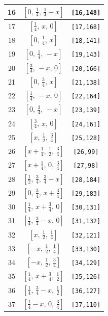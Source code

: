 \documentclass[fleqn,8pt]{jsarticle}
\begin{document}
\begin{longtable}{ccc}
16 & $\left[ 0,\, \frac{1}{4},\, \frac{1}{4} - x \right]$ & {\tt [16,148]} \\ \hline
17 & $\left[ \frac{1}{4},\, x,\, 0 \right]$ & {\tt [17,168]} \\ \hline
18 & $\left[ 0,\, \frac{1}{4},\, x \right]$ & {\tt [18,141]} \\ \hline
19 & $\left[ 0,\, \frac{1}{4},\, - x \right]$ & {\tt [19,143]} \\ \hline
20 & $\left[ \frac{3}{4},\, - x,\, 0 \right]$ & {\tt [20,166]} \\ \hline
21 & $\left[ 0,\, \frac{3}{4},\, x \right]$ & {\tt [21,138]} \\ \hline
22 & $\left[ \frac{1}{4},\, - x,\, 0 \right]$ & {\tt [22,164]} \\ \hline
23 & $\left[ 0,\, \frac{3}{4},\, - x \right]$ & {\tt [23,139]} \\ \hline
24 & $\left[ \frac{3}{4},\, x,\, 0 \right]$ & {\tt [24,161]} \\ \hline
25 & $\left[ x,\, \frac{1}{2},\, \frac{3}{4} \right]$ & {\tt [25,128]} \\ \hline
26 & $\left[ x + \frac{1}{4},\, \frac{1}{2},\, \frac{3}{4} \right]$ & {\tt [26,99]} \\ \hline
27 & $\left[ x + \frac{1}{4},\, 0,\, \frac{3}{4} \right]$ & {\tt [27,98]} \\ \hline
28 & $\left[ \frac{1}{2},\, \frac{3}{4},\, \frac{3}{4} - x \right]$ & {\tt [28,184]} \\ \hline
29 & $\left[ 0,\, \frac{3}{4},\, x + \frac{3}{4} \right]$ & {\tt [29,183]} \\ \hline
30 & $\left[ \frac{1}{4},\, x + \frac{3}{4},\, 0 \right]$ & {\tt [30,131]} \\ \hline
31 & $\left[ \frac{1}{4},\, \frac{3}{4} - x,\, 0 \right]$ & {\tt [31,132]} \\ \hline
32 & $\left[ x,\, \frac{1}{2},\, \frac{1}{4} \right]$ & {\tt [32,121]} \\ \hline
33 & $\left[ - x,\, \frac{1}{2},\, \frac{1}{4} \right]$ & {\tt [33,130]} \\ \hline
34 & $\left[ - x,\, \frac{1}{2},\, \frac{3}{4} \right]$ & {\tt [34,129]} \\ \hline
35 & $\left[ \frac{1}{4},\, x + \frac{3}{4},\, \frac{1}{2} \right]$ & {\tt [35,126]} \\ \hline
36 & $\left[ \frac{1}{4},\, \frac{3}{4} - x,\, \frac{1}{2} \right]$ & {\tt [36,127]} \\ \hline
37 & $\left[ \frac{1}{4} - x,\, 0,\, \frac{3}{4} \right]$ & {\tt [37,110]} \\ \hline

\end{longtable}
\end{document}
